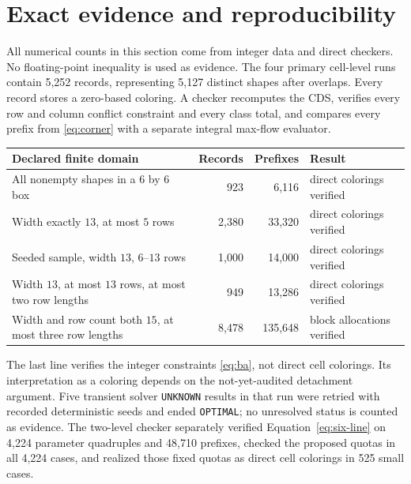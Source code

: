 \documentclass[11pt]{amsart}
\theoremstyle{definition}
\begin{document}
\section{Exact evidence and reproducibility}

All numerical counts in this section come from integer data and direct
checkers.  No floating-point inequality is used as evidence.  The four
primary cell-level runs contain 5,252 records, representing 5,127 distinct
shapes after overlaps.  Every record stores a zero-based coloring.  A checker
recomputes the CDS, verifies every row and column conflict constraint and
every class total, and compares every prefix from \eqref{eq:corner} with a
separate integral max-flow evaluator.

\begin{center}
\small
\begin{tabular}{p{}rrp{}}
\hline
Declared finite domain & Records & Prefixes & Result \\
\hline
All nonempty shapes in a $6$ by $6$ box
  & 923 & 6,116 & direct colorings verified \\
Width exactly $13$, at most $5$ rows
  & 2,380 & 33,320 & direct colorings verified \\
Seeded sample, width $13$, $6$--$13$ rows
  & 1,000 & 14,000 & direct colorings verified \\
Width $13$, at most $13$ rows, at most two row lengths
  & 949 & 13,286 & direct colorings verified \\
Width and row count both $15$, at most three row lengths
  & 8,478 & 135,648 & block allocations verified \\
\hline
\end{tabular}
\end{center}

The last line verifies the integer constraints \eqref{eq:ba}, not direct
cell colorings.  Its interpretation as a coloring depends on the
not-yet-audited detachment argument.  Five transient solver
\texttt{UNKNOWN} results in that run were retried with recorded deterministic
seeds and ended \texttt{OPTIMAL}; no unresolved status is counted as
evidence.  The two-level checker separately verified
Equation~\eqref{eq:six-line} on 4,224 parameter quadruples and 48,710
prefixes, checked the proposed quotas in all 4,224 cases, and realized those
fixed quotas as direct cell colorings in 525 small cases.
\end{document}
